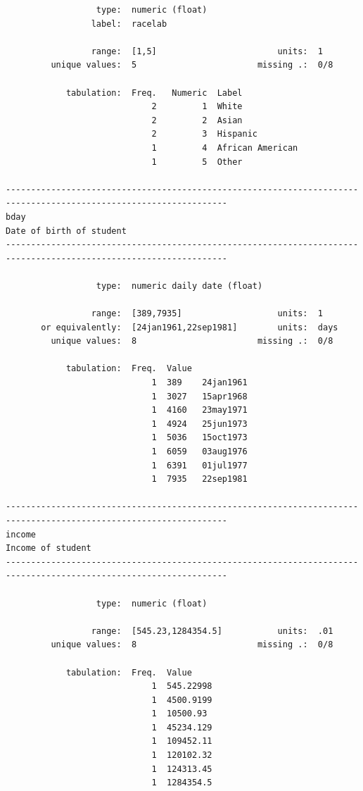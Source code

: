 \documentclass[
]{book}
\begin{document}
\begin{verbatim}
                  type:  numeric (float)
                 label:  racelab

                 range:  [1,5]                        units:  1
         unique values:  5                        missing .:  0/8

            tabulation:  Freq.   Numeric  Label
                             2         1  White
                             2         2  Asian
                             2         3  Hispanic
                             1         4  African American
                             1         5  Other

------------------------------------------------------------------------------------------------------------------
bday                                                                                      Date of birth of student
------------------------------------------------------------------------------------------------------------------

                  type:  numeric daily date (float)

                 range:  [389,7935]                   units:  1
       or equivalently:  [24jan1961,22sep1981]        units:  days
         unique values:  8                        missing .:  0/8

            tabulation:  Freq.  Value
                             1  389    24jan1961
                             1  3027   15apr1968
                             1  4160   23may1971
                             1  4924   25jun1973
                             1  5036   15oct1973
                             1  6059   03aug1976
                             1  6391   01jul1977
                             1  7935   22sep1981

------------------------------------------------------------------------------------------------------------------
income                                                                                           Income of student
------------------------------------------------------------------------------------------------------------------

                  type:  numeric (float)

                 range:  [545.23,1284354.5]           units:  .01
         unique values:  8                        missing .:  0/8

            tabulation:  Freq.  Value
                             1  545.22998
                             1  4500.9199
                             1  10500.93
                             1  45234.129
                             1  109452.11
                             1  120102.32
                             1  124313.45
                             1  1284354.5


\end{verbatim}
\end{document}
